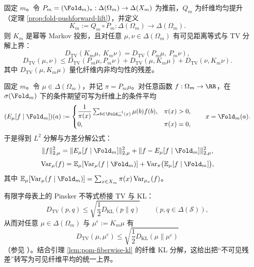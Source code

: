 固定 $m$。令 $P_m=(\Fold_m)_*:\Delta(\Omega_m)\to\Delta(X_m)$ 为推前，$Q_m$ 为纤维均匀提升（定理 \ref{prop:fold-pushforward-lift}），并定义
\begin{equation}
\label{eq:pom-Km-def}
K_m:=Q_m\circ P_m:\Delta(\Omega_m)\to\Delta(\Omega_m).
\end{equation}
则 $K_m$ 是幂等 Markov 投影，且对任意 $\mu,\nu\in\Delta(\Omega_m)$ 有可见距离等式与 TV 分解上界：
\begin{equation}
\label{eq:pom-tv-visible-equality}
D_{\mathrm{TV}}(K_m\mu,\ K_m\nu)=D_{\mathrm{TV}}(P_m\mu,\ P_m\nu),
\end{equation}
\begin{equation}
\label{eq:pom-tv-decomposition-upper}
D_{\mathrm{TV}}(\mu,\nu)\le D_{\mathrm{TV}}(P_m\mu,P_m\nu)+D_{\mathrm{TV}}(\mu,K_m\mu)+D_{\mathrm{TV}}(\nu,K_m\nu).
\end{equation}
其中 $D_{\mathrm{TV}}(\mu,K_m\mu)$ 量化纤维内非均匀性的残差。

固定 $m$。令 $\mu\in\Delta(\Omega_m)$，并记 $\pi=P_m\mu$。对任意函数 $f:\Omega_m\to\RR$，在 $\sigma(\Fold_m)$ 下的条件期望可写为纤维上的条件平均
\begin{equation}
\label{eq:pom-Emu-def}
(E_{\mu}[f\mid\Fold_m])(a)
:=
\begin{cases}
\dfrac{1}{\pi(x)}\sum_{b\in\Fold_m^{-1}(x)}\mu(b)f(b),& \pi(x)>0,\\
0,& \pi(x)=0,
\end{cases}
\qquad x=\Fold_m(a).
\end{equation}
于是得到 $L^2$ 分解与方差分解公式：
\begin{equation}
\label{eq:pom-Emu-pythagoras}
\|f\|_{2,\mu}^2=\|E_{\mu}[f\mid\Fold_m]\|_{2,\mu}^2+\|f-E_{\mu}[f\mid\Fold_m]\|_{2,\mu}^2,
\end{equation}
\begin{equation}
\label{eq:pom-var-decomposition}
\mathrm{Var}_{\mu}(f)=\mathbb{E}_{\mu}[\mathrm{Var}_{\mu}(f\mid\Fold_m)]+\mathrm{Var}_{\pi}\bigl(\mathbb{E}_{\mu}[f\mid\Fold_m]\bigr),
\end{equation}
其中 $\mathbb{E}_{\mu}[\mathrm{Var}_{\mu}(f\mid\Fold_m)]=\sum_{x\in X_m}\pi(x)\,\mathrm{Var}_{\mu_x}(f)$。

有限字母表上的 Pinsker 不等式桥接 TV 与 KL：
\begin{equation}
\label{eq:pinsker-tv-kl}
D_{\mathrm{TV}}(p,q)\le \sqrt{\frac{1}{2}D_{\mathrm{KL}}(p\|q)}\qquad (p,q\in\Delta(\mathcal{S})),
\end{equation}
从而对任意 $\mu\in\Delta(\Omega_m)$ 与 $\mu^e:=K_m\mu$ 有
\begin{equation}
\label{eq:pom-residual-tv-by-kl}
D_{\mathrm{TV}}(\mu,\mu^e)\le \sqrt{\frac{1}{2}D_{\mathrm{KL}}(\mu\|\mu^e)}
\end{equation}
（参见 \cite{CoverThomas2006,Tsybakov2009Nonparametric}）。结合引理 \ref{lem:pom-fiberwise-kl} 的纤维 KL 分解，这给出把“不可见残差”转写为可见纤维平均的统一上界。

